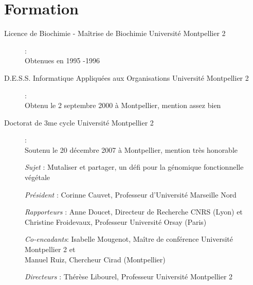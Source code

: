 \section{Formation}
\begin{description}
    \item[Licence de Biochimie - Maîtrise de Biochimie Université Montpellier 2] : \\ Obtenues en 1995 -1996
    \item[D.E.S.S. Informatique Appliquées aux Organisations Université Montpellier 2] : \\ Obtenu le 2 septembre 2000 à Montpellier, mention assez bien

    \item[Doctorat de 3me cycle Université Montpellier 2] : \\ Soutenu le 20 décembre 2007 à Montpellier, mention très honorable
    \item[]\hspace{0.5cm} \textit{Sujet} :  Mutaliser et partager, un défi pour la génomique fonctionnelle végétale 
    \item[]\hspace{0.5cm}  \textit{Président} : Corinne Cauvet, Professeur d'Université Marseille Nord
    \item[]\hspace{0.5cm}  \textit{Rapporteurs} : Anne Doucet, Directeur de Recherche CNRS (Lyon) et \\
                Christine Froidevaux, Professeur Université Orsay (Paris)
    \item[]\hspace{0.5cm}  \textit{Co-encadants}: Isabelle Mougenot, Maître de conférence Université Montpellier 2 et \\
		Manuel Ruiz, Chercheur Cirad (Montpellier)
    \item[]\hspace{0.5cm} \textit{Directeurs} : Thérèse Libourel, Professeur Université Montpellier 2
   
    

	 	
\end{description} 
%
